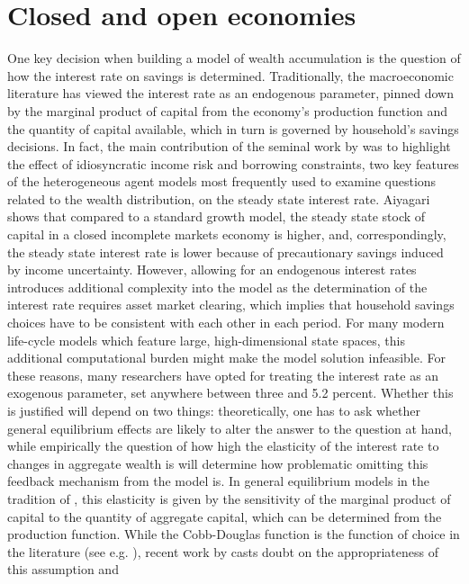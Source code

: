 \section{Closed and open economies}
One key decision when building a model of wealth accumulation is the question
of how the interest rate on savings is determined. Traditionally, the 
macroeconomic literature has viewed the interest rate as an endogenous parameter,
pinned down by the marginal product of capital from the economy's production 
function and the quantity of capital available, which in turn is governed by 
household's savings decisions. In fact, the main contribution of the seminal 
work by \citet{Aiyagari1994} was to highlight the effect of idiosyncratic income
risk and borrowing constraints, two key features of the heterogeneous agent models
most frequently used to examine questions related to the wealth distribution,
on the steady state interest rate. Aiyagari shows that compared to a standard 
growth model, the steady state stock of capital in a closed incomplete markets
economy is higher, and, correspondingly, the steady state interest rate is lower
because of precautionary savings induced by income uncertainty.
However, allowing for an endogenous interest rates introduces additional complexity
into the model as the determination of the interest rate requires asset market 
clearing, which implies that household savings choices have to be consistent 
with each other in each period. For many modern life-cycle models which feature
large, high-dimensional state spaces, this additional computational burden
might make the model solution infeasible.
For these reasons, many researchers have opted for treating the interest rate
as an exogenous parameter, set anywhere between three \citep{Cagetti2003} and
5.2 \citep{GourinchasParker2002} percent. Whether this is justified will depend
on two things: theoretically, one has to ask whether general equilibrium effects
are likely to alter the answer to the question at hand, while empirically the 
question of how high the elasticity of the interest rate to changes in aggregate 
wealth is will determine how problematic omitting this feedback mechanism from 
the model is.
In general equilibrium models in the tradition of \cite{Aiyagari1994}, this 
elasticity is given by the sensitivity of the marginal product of capital to
the quantity of aggregate capital, which can be determined from the production 
function. While the Cobb-Douglas function is the function of choice in the 
literature (see e.g. \citealt{CastanedaRiosRull2003}), recent work by 
\citet{Piketty2014} casts doubt on the appropriateness of this assumption and 
